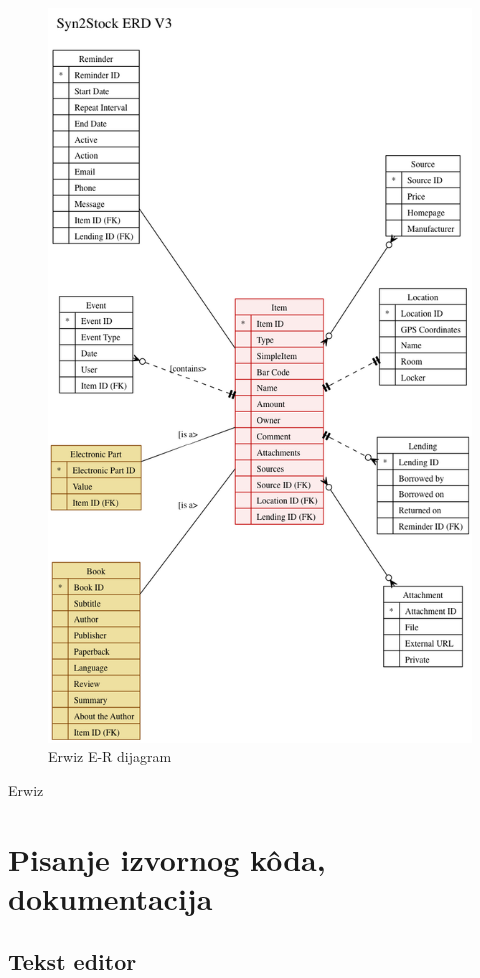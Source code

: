 \documentclass[times, utf8, seminar]{fit}
\begin{document}
\begin{figure}[H]
\centering
\includegraphics[width=12cm]{img/erwiz_example.png}
\caption{Erwiz E-R dijagram}
\end{figure}

Erwiz \href{http://code.google.com/p/knowhow-erp/downloads/list?can=2&q=erwiz}{\color{blue}{download}}

\chapter{Pisanje izvornog k\^oda, dokumentacija}

\section{Tekst editor}
\end{document}
